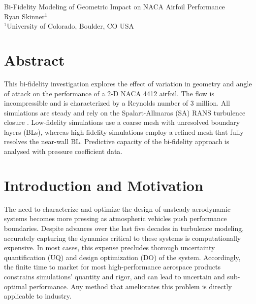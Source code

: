 \documentclass[11pt]{article}
\begin{document}
{
	\fancyhf[CH]{}
	\fancyhf[RH]{\thepage}
	\fancyhf[LF]{}
	\fancyhf[CF]{}
	\fancyhf[RF]{}
}

{
	\fancyhf[CH]{}
	\fancyhf[LF]{}
	\fancyhf[CF]{}
	\fancyhf[RF]{}
}

\pagestyle{allpages}
\thispagestyle{firstpage}
\renewcommand{\sectionmark}[1]{ \markright{#1}{} }

\vspace*{0in}
\begin{center}
\Large
Bi-Fidelity Modeling of Geometric Impact on NACA Airfoil Performance
\\[1ex]
\large
Ryan Skinner$^1$
\\[1ex]
\normalsize
$^1$University of Colorado, Boulder, CO USA
\end{center}

\section*{Abstract}
This bi-fidelity investigation explores the effect of variation in geometry and angle of attack on the performance of a 2-D NACA 4412 airfoil. The flow is incompressible and is characterized by a Reynolds number of 3 million. All simulations are steady and rely on the Spalart-Allmaras (SA) RANS turbulence closure \citep{spalart1992}. Low-fidelity simulations use a coarse mesh with unresolved boundary layers (BLs), whereas high-fidelity simulations employ a refined mesh that fully resolves the near-wall BL. Predictive capacity of the bi-fidelity approach is analysed with pressure coefficient data.

\section{Introduction and Motivation}

The need to characterize and optimize the design of unsteady aerodynamic systems becomes more pressing as atmospheric vehicles push performance boundaries. Despite advances over the last five decades in turbulence modeling, accurately capturing the dynamics critical to these systems is computationally expensive. In most cases, this expense precludes thorough uncertainty quantification (UQ) and design optimization (DO) of the system. Accordingly, the finite time to market for most high-performance aerospace products constrains simulations' quantity and rigor, and can lead to uncertain and sub-optimal performance. Any method that ameliorates this problem is directly applicable to industry.
\end{document}
